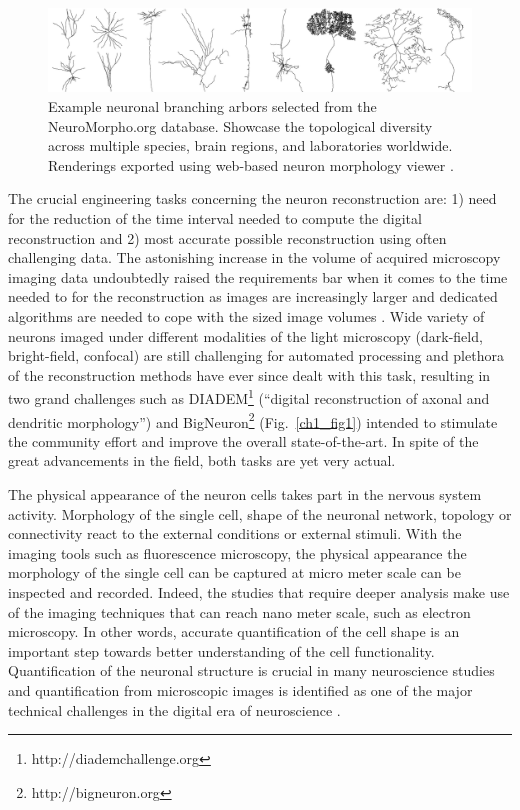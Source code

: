 \begin{figure}[t!]
	\begin{center}
		\includegraphics[width=\textwidth]{ch1_fig7}
	\end{center}
	\caption{Example neuronal branching arbors selected from the NeuroMorpho.org database. Showcase the topological diversity across multiple species, brain regions, and laboratories worldwide. Renderings exported using web-based neuron morphology viewer \cite{bakker2016web}.}
	\label{ch1_fig7}
\end{figure}

The crucial engineering tasks concerning the neuron reconstruction are: 1) need for the reduction of the time interval needed to compute the digital reconstruction and 2) most accurate possible reconstruction using often challenging data. The astonishing increase in the volume of acquired microscopy imaging data \cite{meijering2016imagining} undoubtedly raised the requirements bar when it comes to the time needed to for the reconstruction as images are increasingly larger and dedicated algorithms are needed to cope with the sized image volumes \cite{peng2017automatic}. Wide variety of neurons imaged under different modalities of the light microscopy (dark-field, bright-field, confocal) are still challenging for automated processing \cite{svoboda2011past,peng2011proof} and plethora of the reconstruction methods \cite{peng2011automatic} have ever since dealt with this task, resulting in two grand challenges such as DIADEM\footnote{http://diademchallenge.org} (``digital reconstruction of axonal and dendritic morphology'') and BigNeuron\footnote{http://bigneuron.org} \cite{peng2015diadem,peng2015bigneuron,gillette2011diademchallenge} (Fig.~\ref{ch1_fig1}) intended to stimulate the community effort and improve the overall state-of-the-art. In spite of the great advancements in the field, both tasks are yet very actual.

The physical appearance of the neuron cells takes part in the nervous system activity. Morphology of the single cell, shape of the neuronal network, topology or connectivity react to the external conditions or external stimuli. With the imaging tools such as fluorescence microscopy, the physical appearance the morphology of the single cell can be captured at micro meter scale can be inspected and recorded. Indeed, the studies that require deeper analysis make use of the imaging techniques that can reach nano meter scale, such as electron microscopy. In other words, accurate quantification of the cell shape is an important step towards better understanding of the cell functionality. Quantification of the neuronal structure is crucial in many neuroscience studies \cite{halavi2012digital} and quantification from microscopic images is identified as one of the major technical challenges in the digital era of neuroscience \cite{peng2015diadem}.

